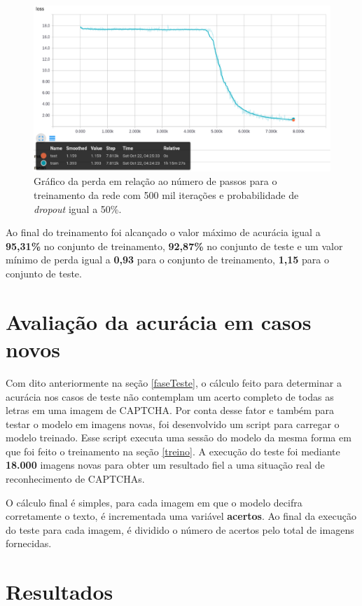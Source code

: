 \begin{figure}[H]
\centering
\includegraphics[scale=0.4]{imagens/loss_500k_dropout50}
\caption{Gráfico da perda em relação ao número de passos para o
  treinamento da rede com 500 mil iterações e probabilidade de
  \textit{dropout} igual a 50\%.}
\label{fig:loss_500k_dropout50}
\end{figure}

Ao final do treinamento foi alcançado o valor máximo de acurácia igual
a {\bf 95,31\%} no conjunto de treinamento, {\bf 92,87\%} no conjunto
de teste e um valor mínimo de perda igual a {\bf 0,93} para o conjunto
de treinamento, {\bf 1,15} para o conjunto de teste.

\section{Avaliação da acurácia em casos novos} \label{acuracia}

Com dito anteriormente na seção \ref{faseTeste}, o cálculo feito
para determinar a acurácia nos casos de teste não contemplam um acerto
completo de todas as letras em uma imagem de CAPTCHA. Por conta desse
fator e também para testar o modelo em imagens novas, foi desenvolvido
um script para carregar o modelo treinado. Esse script executa uma
sessão do modelo da mesma forma em que foi feito o treinamento na
seção \ref{treino}. A execução do teste foi mediante {\bf 18.000}
imagens novas para obter um resultado fiel a uma situação real de
reconhecimento de CAPTCHAs.

O cálculo final é simples, para cada imagem em que o modelo decifra
corretamente o texto, é incrementada uma variável {\bf acertos}. Ao
final da execução do teste para cada imagem, é dividido o número de
acertos pelo total de imagens fornecidas.

\section{Resultados}

